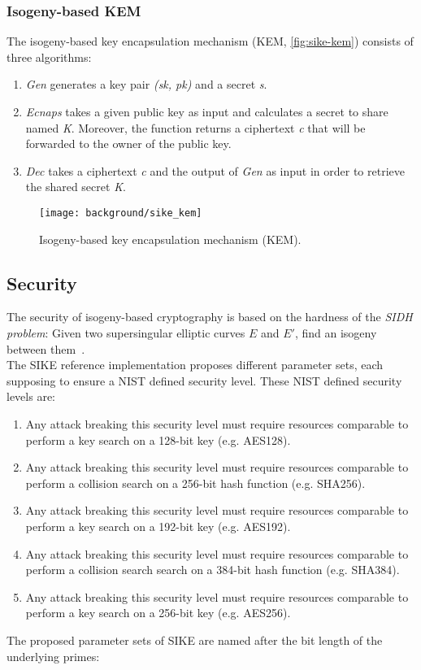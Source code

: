\subsubsection{Isogeny-based \gls{KEM}}
The isogeny-based key encapsulation mechanism (\gls{KEM}, \autoref{fig:sike-kem}) consists of three algorithms:
\begin{enumerate}
\item \textit{Gen} generates a key pair \textit{(sk, pk)} and a secret \textit{s}.
\item \textit{Ecnaps} takes a given public key as input and calculates a secret to share named \textit{K}. Moreover, the function returns a ciphertext \textit{c} that will be forwarded to the owner of the public key.
\item \textit{\gls{Dec}} takes a ciphertext \textit{c} and the output of \textit{Gen} as input in order to retrieve the shared secret \textit{K}.
\end{enumerate}
\begin{figure}[H]
  \centering
  \texttt{[image: background/sike\_kem]}
  \caption[Isogeny-based \gls{KEM}]
  {Isogeny-based key encapsulation mechanism (\gls{KEM}).} \label{fig:sike-kem}
\end{figure}

\subsection{Security}\label{sidh_security}
The security of isogeny-based cryptography is based on the hardness of the \textit{\gls{SIDH} problem}: Given two supersingular elliptic curves $E$ and $E'$, find an isogeny between them~\parencite{sike2020spec}. 
\\
The \gls{SIKE} reference implementation proposes different parameter sets, each supposing to ensure a \gls{NIST} defined security level. These \gls{NIST} defined security levels are:
\begin{enumerate}
\itemsep0em 
	\item Any attack breaking this security level must require resources comparable to perform a key search on a 128-bit key (e.g. AES128).
	\item Any attack breaking this security level must require resources comparable to perform a collision search on a 256-bit hash function (e.g. SHA256).
	\item Any attack breaking this security level must require resources comparable to perform a key search on a 192-bit key (e.g. AES192).
	\item Any attack breaking this security level must require resources comparable to perform a collision search search on a 384-bit hash function (e.g. SHA384).
	\item Any attack breaking this security level must require resources comparable to perform a key search on a 256-bit key (e.g. AES256).
\end{enumerate}
The proposed parameter sets of \gls{SIKE} are named after the bit length of the underlying primes:

